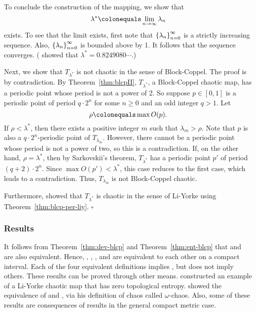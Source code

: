 \documentclass[10pt,twoside,draft]{book}
\begin{document}
\begin{example}
To conclude the construction of the mapping, we show that
\begin{equation*}
  \lambda^* \ceq \lim\limits_{n \to \infty} \lambda_n
\end{equation*}
exists.
To see that the limit exists, first note that $\left \{ \lambda_n \right \}^{\infty}_{n = 0}$ is a strictly increasing sequence.
Also, $\left \{ \lambda_n \right \}^{\infty}_{n = 0}$ is bounded above by 1.
It follows that the sequence converges.
(\citet{misiurewicz1} showed that $\lambda^* = 0.8249080 \cdots$.)

Next, we show that $T_{\lambda^*}$ is not chaotic in the sense of Block-Coppel.
The proof is by contradiction.
By Theorem~\ref{thm:blcpII}, $T_{\lambda^*}$, a Block-Coppel chaotic map, has a periodic point whose period is not a power of 2.
So suppose $p \in [0,1]$ is a periodic point of period $q\cdot 2^n$ for some $n \geq 0$ and an odd integer $q > 1$.
Let 
\begin{equation*}
  \rho \ceq \max O(p).
\end{equation*}
If $\rho < \lambda^*$, then there exists a positive integer $m$ such that $\lambda_m > \rho$.
Note that $p$ is also a $q\cdot 2^n$-periodic point of $T_{\lambda_m}$.
However, there cannot be a periodic point whose period is not a power of two, so this is a contradiction.
If, on the other hand, $\rho = \lambda^*$, then by Sarkovskii's theorem, $T_{\lambda^*}$ has a periodic point $p'$ of period $(q+2)\cdot 2^n$.
Since $\max O(p') < \lambda^*$, this case reduces to the first case, which leads to a contradiction.
Thus, $T_{\lambda_m}$ is not Block-Coppel chaotic.

Furthermore, \citet[p.146]{blockcoppel} showed that $T_{\lambda^*}$ is chaotic in the sense of Li-Yorke using Theorem~\ref{thm:blcp-per-liy}. $\square$
\label{eg:counterexample}
\end{example}

\subsubsection*{Results}
It follows from Theorem~\ref{thm:dev-blcp} and Theorem~\ref{thm:ent-blcp} that \dev and \akm are also equivalent.
Hence, \dev, \wig, \blcp, and \akm are equivalent to each other on a compact interval.
Each of the four equivalent definitions implies \liy, but \liy does not imply others.
These results can be proved through other means.
\citet{smital} constructed an example of a Li-Yorke chaotic map that has zero topological entropy.
\citet{omegachaos} showed the equivalence of \dev and \akm, via his definition of chaos called $\omega$-chaos.
Also, some of these results are consequences of results in the general compact metric case.
\end{document}
